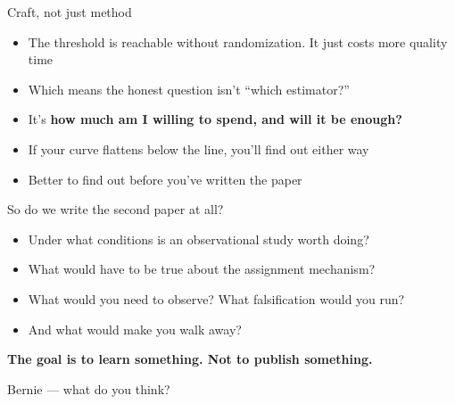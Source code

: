 \documentclass{beamer}
\newcommand{\highlight}[1]{\textcolor{accent}{\textbf{#1}}}
\newcommand{\deemph}[1]{\textcolor{warmgray}{\small #1}}
\begin{document}
\begin{frame}{Craft, not just method}

\begin{itemize}
\item The threshold is reachable without randomization. It just costs more quality time
\item Which means the honest question isn't ``which estimator?''
\item It's \highlight{how much am I willing to spend, and will it be enough?}
\end{itemize}

\vspace{0.8em}

\begin{itemize}
\item If your curve flattens below the line, you'll find out either way
\item Better to find out before you've written the paper
\end{itemize}

\end{frame}


\begin{frame}{So do we write the second paper at all?}

\begin{itemize}
\item Under what conditions is an observational study worth doing?
\item What would have to be true about the assignment mechanism?
\item What would you need to observe? What falsification would you run?
\item And what would make you walk away?
\end{itemize}

\vspace{1em}

\begin{center}
\highlight{The goal is to learn something. Not to publish something.}
\end{center}

\vspace{0.8em}

\deemph{Bernie --- what do you think?}

\end{frame}
\end{document}
